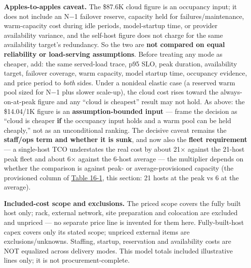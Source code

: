 \textbf{Apples-to-apples caveat.} The \$87.6K cloud figure is an
occupancy input; it does not include an N−1 failover reserve, capacity
held for failures/maintenance, warm-capacity cost during idle periods,
model-startup time, or provider availability variance, and the self-host
figure does not charge for the same availability target's redundancy. So
the two are \textbf{not compared on equal reliability or load-serving
assumptions}. Before treating any mode as cheaper, add: the same
served-load trace, p95 SLO, peak duration, availability target, failover
coverage, warm capacity, model startup time, occupancy evidence, and
price period to \emph{both} sides. Under a nonideal elastic case (a
reserved warm pool sized for N−1 plus slower scale-up), the cloud cost
rises toward the always-on-at-peak figure and any ``cloud is cheapest''
result may not hold. As above: the \$14.04/1K figure is an
\textbf{assumption-bounded input} --- frame the decision as ``cloud is
cheaper \textbf{if} the occupancy input holds and a warm pool can be
held cheaply,'' not as an unconditional ranking. The decisive caveat
remains the \textbf{staff/ops term and whether it is sunk}, and now also
the \textbf{fleet requirement} --- a single-host TCO understates the
real cost by about 21× against the 21-host peak fleet and about 6×
against the 6-host average --- the multiplier depends on whether the
comparison is against peak- or average-provisioned capacity (the
provisioned column of \hyperref[tab:16.1]{Table 16-1}, this section: 21 hosts at the peak vs
6 at the average).

\textbf{Included-cost scope and exclusions.} The priced scope covers the
fully built host only; rack, external network, site preparation and
colocation are excluded and unpriced --- no separate price line is
invented for them here. Fully-built-host capex covers only its stated
scope; unpriced external items are exclusions/unknowns. Staffing,
startup, reservation and availability costs are NOT equalized across
delivery modes. This model totals included illustrative lines only; it
is not procurement-complete.

